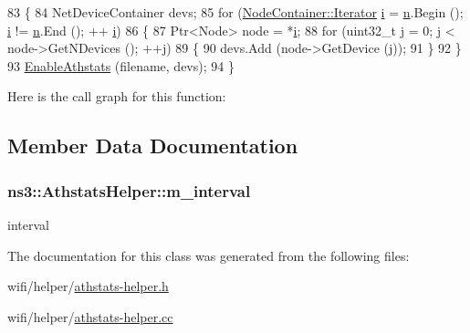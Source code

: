 \begin{DoxyCode}
83 \{
84   NetDeviceContainer devs;
85   \textcolor{keywordflow}{for} (\hyperlink{classns3_1_1NodeContainer_aa1a9f2d2b09bfef7d066d3974bca2cc4}{NodeContainer::Iterator} \hyperlink{bernuolliDistribution_8m_a6f6ccfcf58b31cb6412107d9d5281426}{i} = \hyperlink{namespacesample-rng-plot_aeb5ee5c431e338ef39b7ac5431242e1d}{n}.Begin (); \hyperlink{bernuolliDistribution_8m_a6f6ccfcf58b31cb6412107d9d5281426}{i} != \hyperlink{namespacesample-rng-plot_aeb5ee5c431e338ef39b7ac5431242e1d}{n}.End (); ++
      \hyperlink{bernuolliDistribution_8m_a6f6ccfcf58b31cb6412107d9d5281426}{i})
86     \{
87       Ptr<Node> node = *\hyperlink{bernuolliDistribution_8m_a6f6ccfcf58b31cb6412107d9d5281426}{i};
88       \textcolor{keywordflow}{for} (uint32\_t j = 0; j < node->GetNDevices (); ++j)
89         \{
90           devs.Add (node->GetDevice (j));
91         \}
92     \}
93   \hyperlink{classns3_1_1AthstatsHelper_aa8fa3e8309af2f6a7293b3b1364a6f8f}{EnableAthstats} (filename, devs);
94 \}
\end{DoxyCode}


Here is the call graph for this function\+:




\subsection{Member Data Documentation}
\subsubsection[{\texorpdfstring{m\+\_\+interval}{m_interval}}]{ ns3\+::\+Athstats\+Helper\+::m\+\_\+interval\hspace{0.3cm}{\ttfamily [private]}}\hypertarget{classns3_1_1AthstatsHelper_a78faf29aed06227a57023267aa98d16b}{}\label{classns3_1_1AthstatsHelper_a78faf29aed06227a57023267aa98d16b}


interval 



The documentation for this class was generated from the following files\+:\begin{DoxyCompactItemize}
\item 
wifi/helper/\hyperlink{athstats-helper_8h}{athstats-\/helper.\+h}\item 
wifi/helper/\hyperlink{athstats-helper_8cc}{athstats-\/helper.\+cc}\end{DoxyCompactItemize}
